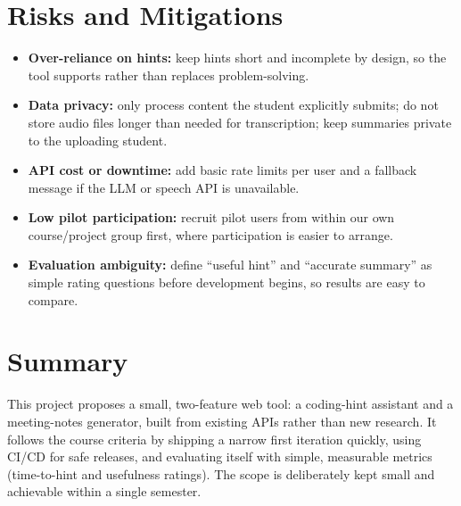 \documentclass[11pt]{article}
\begin{document}
\section{Risks and Mitigations}
\begin{itemize}
    \item \textbf{Over-reliance on hints:} keep hints short and incomplete by design, so the tool supports rather than replaces problem-solving.
    \item \textbf{Data privacy:} only process content the student explicitly submits; do not store audio files longer than needed for transcription; keep summaries private to the uploading student.
    \item \textbf{API cost or downtime:} add basic rate limits per user and a fallback message if the LLM or speech API is unavailable.
    \item \textbf{Low pilot participation:} recruit pilot users from within our own course/project group first, where participation is easier to arrange.
    \item \textbf{Evaluation ambiguity:} define ``useful hint'' and ``accurate summary'' as simple rating questions before development begins, so results are easy to compare.
\end{itemize}

\section{Summary}
This project proposes a small, two-feature web tool: a coding-hint assistant and a meeting-notes generator, built from existing APIs rather than new research. It follows the course criteria by shipping a narrow first iteration quickly, using CI/CD for safe releases, and evaluating itself with simple, measurable metrics (time-to-hint and usefulness ratings). The scope is deliberately kept small and achievable within a single semester.
\end{document}
